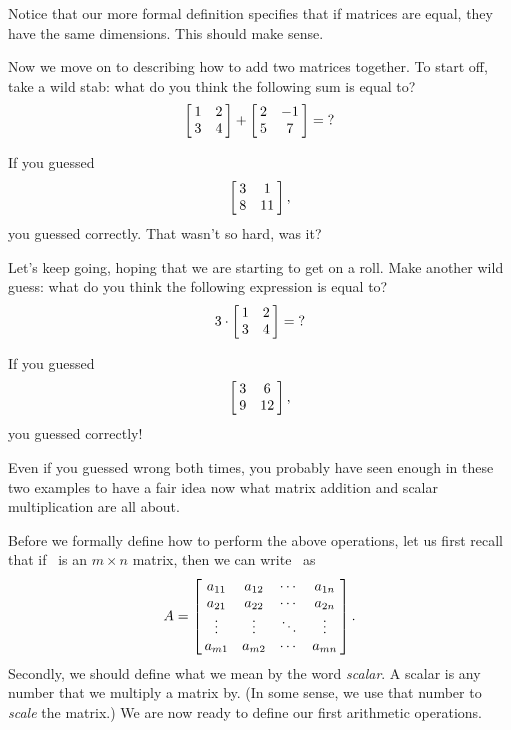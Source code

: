 Notice that our more formal definition specifies that if matrices are equal, they have the same dimensions. This should make sense.

Now we move on to describing how to add two matrices together. To start off, take a wild stab: what do you think the following sum is equal to? $$\bmx{cc}1&2\\3&4\emx + \bmx{cc}2&-1\\5&7\emx = \text{?}$$

If you guessed $$\bmx{cc}3&1\\8&11\emx,$$ you guessed correctly. That wasn't so hard, was it?

Let's keep going, hoping that we are starting to get on a roll. Make another wild guess: what do you think the following expression is equal to? $$3\cdot\bmx{cc}1&2\\3&4\emx=\text{?}$$

If you guessed $$\bmx{cc}3&6\\9&12\emx,$$ you guessed correctly! 

Even if you guessed wrong both times, you probably have seen enough in these two examples to have a fair idea now what matrix addition and scalar multiplication are all about. 

Before we formally define how to perform the above operations, let us first recall that if \tta\ is an $m\times n$ matrix, then we can write \tta\ as $$\tta =\bmx{cccc}a_{11}&a_{12}&\cdots&a_{1n}\\a_{21}&a_{22}&\cdots&a_{2n}\\\vdots&\vdots&\ddots&\vdots\\a_{m1}&a_{m2}&\cdots&a_{mn}\emx.$$ Secondly, we should define what we mean by the word \textit{scalar}. A scalar is any number that we multiply a matrix by. (In some sense, we use that number to \textit{scale} the matrix.) We are now ready to define our first arithmetic operations.


